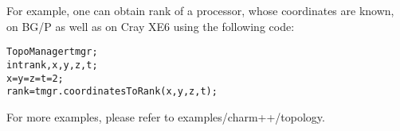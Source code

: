 \noindent For example, one can obtain rank of a processor, whose coordinates are known, on 
BG/P as well as on Cray XE6 using the following code:

\begin{alltt}
TopoManager tmgr;
int rank,x,y,z,t;
x = y = z = t = 2;
rank = tmgr.coordinatesToRank(x,y,z,t);
\end{alltt}

\noindent For more examples, please refer to examples/charm++/topology.



